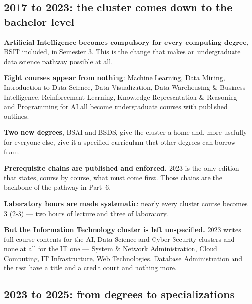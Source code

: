 \documentclass[11pt,a4paper,oneside]{report}
\begin{document}
\subsection{2017 to 2023: the cluster comes down to the bachelor level}

\begin{tight}
  \item \textbf{Artificial Intelligence becomes compulsory for every computing
        degree}, BSIT included, in Semester 3. This is the change that makes an
        undergraduate data science pathway possible at all.
  \item \textbf{Eight courses appear from nothing}: Machine Learning, Data
        Mining, Introduction to Data Science, Data Visualization, Data
        Warehousing \& Business Intelligence, Reinforcement Learning, Knowledge
        Representation \& Reasoning and Programming for AI all become
        undergraduate courses with published outlines.
  \item \textbf{Two new degrees}, BSAI and BSDS, give the cluster a home and,
        more usefully for everyone else, give it a specified curriculum that
        other degrees can borrow from.
  \item \textbf{Prerequisite chains are published and enforced.} 2023 is the only
        edition that states, course by course, what must come first. Those chains
        are the backbone of the pathway in Part~6.
  \item \textbf{Laboratory hours are made systematic}: nearly every cluster
        course becomes 3 (2-3) --- two hours of lecture and three of laboratory.
  \item \textbf{But the Information Technology cluster is left unspecified.}
        2023 writes full course contents for the AI, Data Science and Cyber
        Security clusters and none at all for the IT one --- System \& Network
        Administration, Cloud Computing, IT Infrastructure, Web Technologies,
        Database Administration and the rest have a title and a credit count and
        nothing more.
\end{tight}

\subsection{2023 to 2025: from degrees to specializations}
\end{document}
